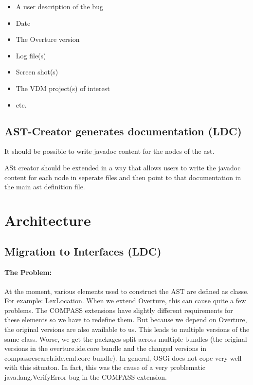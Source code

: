\documentclass[11pt]{overturerep} \usepackage{t1enc,times,a4,t1enc}
\begin{document}
\begin{itemize} 
    \item A user description of the bug 
    \item Date 
    \item The Overture version 
    \item Log file(s) 
    \item Screen shot(s) 
    \item The VDM project(s) of interest 
    \item etc.  
\end{itemize}




\section{AST-Creator generates documentation (LDC)}

It should be possible to write javadoc content for the nodes of the ast.

ASt creator should be extended in a way that allows users to write the javadoc 
content for each node in seperate files and then point to that documentation in
the main ast definition file.





\chapter{Architecture}


\section{Migration to Interfaces (LDC) } \label{sec:interfacemig}

\subsubsection{The Problem:}

At the moment, various elements used to construct the AST are defined as
classe. For example: \textsf{LexLocation}. When we extend Overture, this
can cause quite a few problems. The COMPASS extensions have slightly
different requirements for these elements so we have to redefine them. But
because we depend on Overture, the original versions are also available to
us. This leads to multiple versions of the same class. Worse, we get the
packages split across multiple bundles (the original versions in the
overture.ide.core bundle and the changed versions in
compassresearch.ide.cml.core bundle). In general, OSGi does not cope very
well with this situaton. In fact, this was the cause of a very problematic
\textsf{java.lang.VerifyError} bug in the COMPASS extension.
\end{document}
